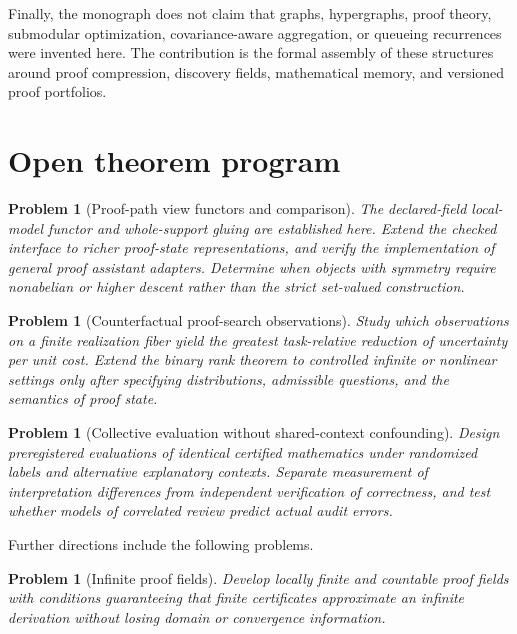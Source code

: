 \documentclass[11pt,oneside]{article}
\theoremstyle{komorebiplain}
\theoremstyle{komorebidefinition}
\newtheorem{problem}[theorem]{Problem}
\theoremstyle{komorebiremark}
\begin{document}
Finally, the monograph does not claim that graphs, hypergraphs, proof theory, submodular optimization, covariance-aware aggregation, or queueing recurrences were invented here. The contribution is the formal assembly of these structures around proof compression, discovery fields, mathematical memory, and versioned proof portfolios.


\section{Open theorem program}
\label{sec:old28}

\begin{problem}[Proof-path view functors and comparison]
\label{res:28:1}
The declared-field local-model functor and whole-support gluing are established here. Extend the checked interface to richer proof-state representations, and verify the implementation of general proof assistant adapters. Determine when objects with symmetry require nonabelian or higher descent rather than the strict set-valued construction.
\end{problem}

\begin{problem}[Counterfactual proof-search observations]
\label{res:28:2}
Study which observations on a finite realization fiber yield the greatest task-relative reduction of uncertainty per unit cost. Extend the binary rank theorem to controlled infinite or nonlinear settings only after specifying distributions, admissible questions, and the semantics of proof state.
\end{problem}

\begin{problem}[Collective evaluation without shared-context confounding]
\label{res:28:3}
Design preregistered evaluations of identical certified mathematics under randomized labels and alternative explanatory contexts. Separate measurement of interpretation differences from independent verification of correctness, and test whether models of correlated review predict actual audit errors.
\end{problem}



Further directions include the following problems.

\begin{problem}[Infinite proof fields]
\label{res:28:4}
Develop locally finite and countable proof fields with conditions guaranteeing that finite certificates approximate an infinite derivation without losing domain or convergence information.
\end{problem}
\end{document}
